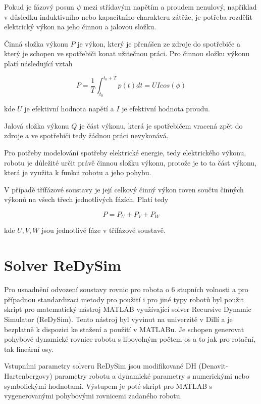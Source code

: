Pokud je fázový posun $\psi$ mezi střídavým napětím a proudem nenulový, například v důsledku induktivního nebo kapacitního charakteru zátěže, je potřeba rozdělit elektrický výkon na jeho činnou a jalovou složku. 

Činná složka výkonu $P$ je výkon, který je přenášen ze zdroje do spotřebiče a který je schopen ve spotřebiči konat užitečnou práci. Pro činnou složku výkonu platí následující vztah

\begin{equation}
P = \frac{1}{T} \int_{t_0}^{t_0 + T} p(t)dt = UIcos(\phi)
\label{act_power_eq}
\end{equation}  

kde $U$ je efektivní hodnota napětí a $I$ je efektivní hodnota proudu.

Jalová složka výkonu $Q$ je část výkonu, která je spotřebičem vracená zpět do zdroje a ve spotřebiči tedy žádnou práci nevykonává.

Pro potřeby modelování spotřeby elektrické energie, tedy elektrického výkonu, robotu je důležité určit právě činnou složku výkonu, protože je to ta část výkonu, která je využita k funkci robotu a jeho pohybu. 

V případě třífázové soustavy je její celkový činný výkon roven součtu činných výkonů na všech třech jednotlivých fázích. Platí tedy

\begin{equation}
P = P_U + P_V + P_W
\label{3ph_power_eq}
\end{equation}  

kde $U,V,W$ jsou jednotlivé fáze v třífázové soustavě.


\section{Solver ReDySim}

Pro usnadnění odvození soustavy rovnic pro robota o 6 stupních volnosti a pro případnou standardizaci metody pro použití i pro jiné typy robotů byl použit skript pro matematický nástroj MATLAB využívající solver Recursive Dynamic Simulator (ReDySim)\cite{redysim}. Tento nástroj byl vyvinut na univerzitě v Dillí a je bezplatně k dispozici ke stažení a použití v MATLABu. Je schopen generovat pohybové dynamické rovnice robotu s libovolným počtem os a to jak pro rotační, tak lineární osy. 

Vstupními parametry solveru ReDySim jsou modifikované DH (Denavit-Hartenbergovy) parametry robotu a dynamické parametry s numerickými nebo symbolickými hodnotami. Výstupem je poté skript pro MATLAB s vygenerovanými pohybovými rovnicemi zadaného robotu.  

